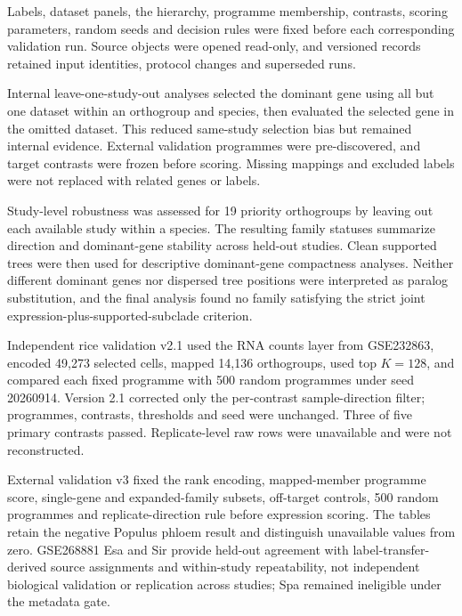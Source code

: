 
Labels, dataset panels, the hierarchy, programme membership, contrasts, scoring parameters, random seeds and decision rules were fixed before each corresponding validation run. Source objects were opened read-only, and versioned records retained input identities, protocol changes and superseded runs.

Internal leave-one-study-out analyses selected the dominant gene using all but one dataset within an orthogroup and species, then evaluated the selected gene in the omitted dataset. This reduced same-study selection bias but remained internal evidence. External validation programmes were pre-discovered, and target contrasts were frozen before scoring. Missing mappings and excluded labels were not replaced with related genes or labels.


Study-level robustness was assessed for 19 priority orthogroups by leaving out each available study within a species. The resulting family statuses summarize direction and dominant-gene stability across held-out studies. Clean supported trees were then used for descriptive dominant-gene compactness analyses. Neither different dominant genes nor dispersed tree positions were interpreted as paralog substitution, and the final analysis found no family satisfying the strict joint expression-plus-supported-subclade criterion.

Independent rice validation v2.1 used the RNA counts layer from GSE232863, encoded 49,273 selected cells, mapped 14,136 orthogroups, used top $K=128$, and compared each fixed programme with 500 random programmes under seed 20260914. Version 2.1 corrected only the per-contrast sample-direction filter; programmes, contrasts, thresholds and seed were unchanged. Three of five primary contrasts passed. Replicate-level raw rows were unavailable and were not reconstructed.

External validation v3 fixed the rank encoding, mapped-member programme score, single-gene and expanded-family subsets, off-target controls, 500 random programmes and replicate-direction rule before expression scoring. The tables retain the negative Populus phloem result and distinguish unavailable values from zero. GSE268881 Esa and Sir provide held-out agreement with label-transfer-derived source assignments and within-study repeatability, not independent biological validation or replication across studies; Spa remained ineligible under the metadata gate.

